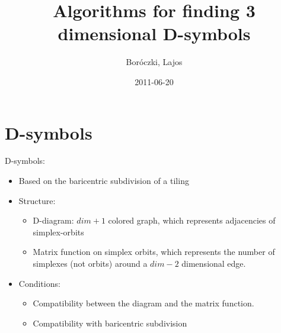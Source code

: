 \usepackage[english]{babel}
\usepackage[T1]{fontenc}
\usepackage[utf8]{inputenc}
\usepackage{graphicx}
\usepackage{listings}
\usepackage{amsmath}
\usepackage{amssymb}
\usepackage{ae,aecompl}


\title{Algorithms for finding 3 dimensional D-symbols}
\author{Boróczki, Lajos}
\date{2011-06-20}



\begin{frame}
  \maketitle
\end{frame}

\begin{frame}
  \tableofcontents
\end{frame}
\newpage

\section{D-symbols}
\begin{frame}
  D-symbols:
  \begin{itemize}
    \item Based on the baricentric subdivision of a tiling
    \item Structure:
      \begin{itemize}
	\item D-diagram: $dim+1$ colored graph, which represents adjacencies of
	  simplex-orbits
	\item Matrix function on simplex orbits, which represents the number of
	  simplexes (not orbits) around a $dim-2$ dimensional edge.
      \end{itemize}
    \item Conditions:
      \begin{itemize}
	\item Compatibility between the diagram and the matrix function.
	\item Compatibility with baricentric subdivision
      \end{itemize}
  \end{itemize}
\end{frame}

